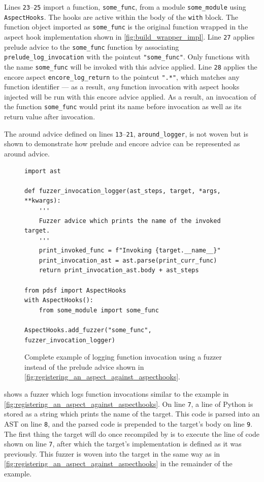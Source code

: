 Lines \texttt{23}--\texttt{25} import a function, \lstinline{some_func}, from a
module \lstinline{some_module} using \lstinline{AspectHooks}. The hooks are
active within the body of the \lstinline{with} block. The function object
imported as
\lstinline{some_func} is the original function wrapped in the aspect hook
implementation shown in \cref{fig:build_wrapper_impl}. Line \texttt{27} applies
prelude advice to the \lstinline{some_func} function by associating
\lstinline{prelude_log_invocation} with the pointcut \lstinline{"some_func"}.
Only functions with the name \lstinline{some_func} will be invoked with this
advice applied. Line \texttt{28} applies the encore aspect
\lstinline{encore_log_return} to the pointcut \lstinline{".*"}, which matches
any function identifier --- as a result, \emph{any} function invocation with
aspect hooks injected will be run with this encore advice applied. As a result,
an invocation of the function \lstinline{some_func} would print its name before
invocation as well as its return value after invocation. 

The around advice defined on lines \texttt{13}--\texttt{21},
\lstinline{around_logger}, is not woven but is shown to demonstrate how prelude
and encore advice can be represented as around advice.

\begin{figure}
    \begin{lstlisting}[style=footnotesize_python]
import ast

def fuzzer_invocation_logger(ast_steps, target, *args, **kwargs):
    '''
    Fuzzer advice which prints the name of the invoked target.
    '''
    print_invoked_func = f"Invoking {target.__name__}"
    print_invocation_ast = ast.parse(print_curr_func)
    return print_invocation_ast.body + ast_steps

from pdsf import AspectHooks
with AspectHooks():
    from some_module import some_func

AspectHooks.add_fuzzer("some_func", fuzzer_invocation_logger)
    \end{lstlisting}
    \caption{Complete example of logging function invocation using a fuzzer instead of the prelude advice shown in \cref{fig:registering_an_aspect_against_aspecthooks}.}
    \label{fig:fuzzer_logging_example}
\end{figure}

 shows a fuzzer which logs function invocations
similar to the example in \cref{fig:registering_an_aspect_against_aspecthooks}.
On line \texttt{7}, a line of Python is stored as a string which prints the name of the
target. This code is parsed into an AST on line \texttt{8}, and the parsed code
is prepended to the target's body on line \texttt{9}. The first thing the target
will do once recompiled by \pdsf{} is to execute the line of code shown on line
\texttt{7}, after which the target's implementation is defined as it was
previously. This fuzzer is woven into the target in the same way as in
\cref{fig:registering_an_aspect_against_aspecthooks} in the remainder of the
example.


